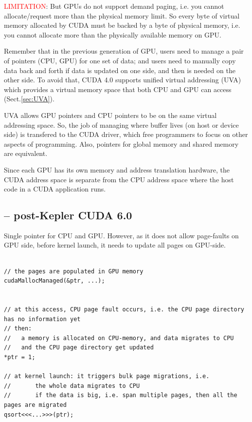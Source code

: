 \textcolor{red}{LIMITATION}: But GPUs do not support demand paging, i.e. you
cannot allocate/request more than the physical memory limit. So every byte of
virtual memory allocated by CUDA must be backed by a byte of physical memory,
i.e. you cannot allocate more than the physically available memory on GPU.

Remember that in the previous generation of GPU, users need to manage a pair of
pointers (CPU, GPU) for one set of data; and users need to manually copy data
back and forth if data is updated on one side, and then is needed on the other
side. To avoid that, CUDA 4.0 supports unified virtual addressing (UVA) which 
provides a virtual memory space that both CPU and GPU can access (Sect.\ref{sec:UVA}).

UVA allows GPU pointers and CPU pointers to be on the same virtual addressing
space. So, the job of managing where buffer lives (on host or device side) is
transfered to the CUDA driver, which free programmers to focus on other aspects
of programming. Also, pointers for global memory and shared memory are
equivalent.

Since each GPU has its own memory and address translation hardware, the CUDA
address space is separate from the CPU address space where the host code in a
CUDA application runs.




\subsection{-- post-Kepler CUDA 6.0}

Single pointer for CPU and GPU. However, as it does not allow page-faults on GPU
side, before kernel launch, it needs to update all pages on GPU-side.

\begin{verbatim}

// the pages are populated in GPU memory
cudaMallocManaged(&ptr, ...); 


// at this access, CPU page fault occurs, i.e. the CPU page directory has no information yet
// then: 
//   a memory is allocated on CPU-memory, and data migrates to CPU
//   and the CPU page directory get updated
*ptr = 1; 

// at kernel launch: it triggers bulk page migrations, i.e. 
//       the whole data migrates to CPU
//       if the data is big, i.e. span multiple pages, then all the pages are migrated
qsort<<<...>>>(ptr);
\end{verbatim}

